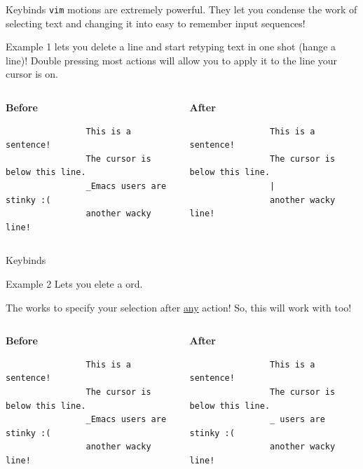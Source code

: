 \documentclass{beamer}
\begin{document}
\begin{frame}[fragile]{Keybinds}
	\texttt{vim} motions are extremely powerful. They let you condense the
	work of selecting text and changing it into easy to remember input
	sequences!
	\pause

	\begin{exampleblock}{Example 1}
		 lets you delete a line and start retyping text in one
		shot (hange a line)! Double pressing most actions will
		allow you to apply it to the line your cursor is on.
		\pause

		\bigskip

		\begin{columns}
			\begin{column}{0.5\textwidth}
				\textbf{Before}
				\begin{verbatim}
				This is a sentence!
				The cursor is below this line.
				_Emacs users are stinky :(
				another wacky line!
				\end{verbatim}
			\end{column}
			\begin{column}{0.5\textwidth}
				\textbf{After}
				\begin{verbatim}
				This is a sentence!
				The cursor is below this line.
				|
				another wacky line!
				\end{verbatim}
			\end{column}
		\end{columns}
	\end{exampleblock}
\end{frame}

\begin{frame}[fragile]{Keybinds}
	\begin{exampleblock}{Example 2}
		 Lets you elete a \keys{w}ord.
		\pause

		The  works to specify your selection after
		\underline{any} action! So, this will work with  too!
		\pause

		\medskip

		\begin{columns}
			\begin{column}{0.5\textwidth}
				\textbf{Before}
				\begin{verbatim}
				This is a sentence!
				The cursor is below this line.
				_Emacs users are stinky :(
				another wacky line!
				\end{verbatim}
			\end{column}
			\begin{column}{0.5\textwidth}
				\textbf{After}
				\begin{verbatim}
				This is a sentence!
				The cursor is below this line.
				_ users are stinky :(
				another wacky line!
				\end{verbatim}
			\end{column}
		\end{columns}
	\end{exampleblock}
\end{frame}
\end{document}
